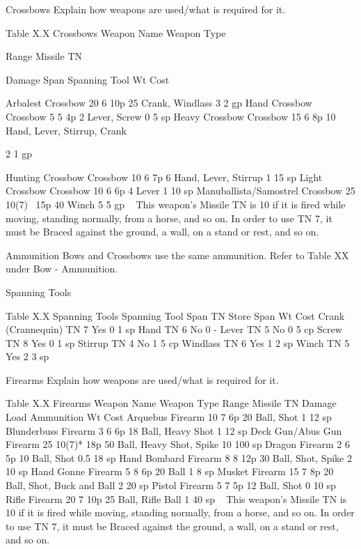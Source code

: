 \documentclass[oneside,11pt,english]{book}
\begin{document}
 

Crossbows 
Explain how weapons are used/what is required for it. 

 
Table X.X Crossbows 
Weapon Name Weapon 
Type 

Range Missile 
TN 

Damage Span Spanning Tool Wt Cost 

Arbalest Crossbow 20 6 10p 25 Crank, Windlass 3 2 gp 
Hand Crossbow Crossbow 5 5 4p 2 Lever, Screw 0 5 sp 
Heavy Crossbow Crossbow 15 6 8p 10 Hand, Lever, Stirrup, 
Crank 

2 1 gp 

Hunting Crossbow Crossbow 10 6 7p 6 Hand, Lever, Stirrup 1 15 
sp 
Light Crossbow Crossbow 10 6 6p 4 Lever 1 10 
sp 
Manuballista/Samostrel Crossbow 25 10(7)~ 15p 40 Winch 5 5 gp 
~ This weapon’s Missile TN is 10 if it is fired while moving, standing normally, from a horse, and so on. In order to use TN 7, it 
must be Braced against the ground, a wall, on a stand or rest, and so on. 

 

Ammunition 
Bows and Crossbows use the same ammunition. Refer to Table XX under Bow - Ammunition. 

 


Spanning Tools 

 
Table X.X Spanning Tools 
Spanning Tool Span TN Store Span Wt Cost 
Crank (Crannequin) TN 7 Yes 0 1 sp 
Hand TN 6 No 0 - 
Lever TN 5 No 0 5 cp 
Screw TN 8 Yes 0 1 sp 
Stirrup TN 4 No 1 5 cp 
Windlass TN 6 Yes 1 2 sp 
Winch TN 5 Yes 2 3 sp 

 

Firearms 
Explain how weapons are used/what is required for it. 

 
Table X.X Firearms 
Weapon Name Weapon Type Range Missile TN Damage Load Ammunition Wt Cost 
Arquebus Firearm 10 7 6p 20 Ball, Shot 1 12 sp 
Blunderbuss Firearm 3 6 6p 18 Ball, Heavy Shot 1 12 sp 
Deck Gun/Abus Gun Firearm 25 10(7)* 18p 50 Ball, Heavy Shot, Spike 10 100 sp 
Dragon Firearm 2 6 5p 10 Ball, Shot 0.5 18 sp 
Hand Bombard Firearm 8 8 12p 30 Ball, Shot, Spike 2 10 sp 
Hand Gonne Firearm 5 8 6p 20 Ball 1 8 sp 
Musket Firearm 15 7 8p 20 Ball, Shot, Buck and Ball 2 20 sp 
Pistol Firearm 5 7 5p 12 Ball, Shot 0 10 sp 
Rifle Firearm 20 7 10p 25 Ball, Rifle Ball 1 40 sp 
~ This weapon’s Missile TN is 10 if it is fired while moving, standing normally, from a horse, and so on. In order to use TN 7, it 
must be Braced against the ground, a wall, on a stand or rest, and so on. 
\end{document}
